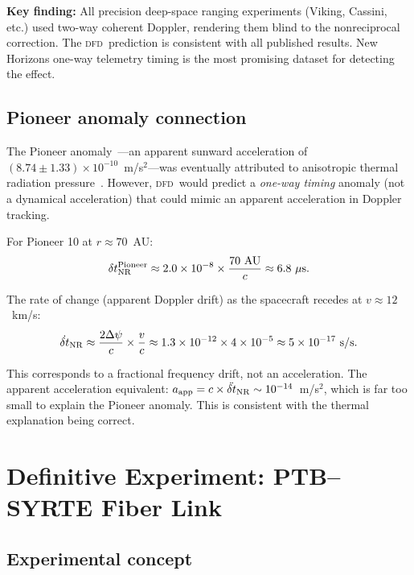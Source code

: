 \documentclass[aps,prl,twocolumn,superscriptaddress,showpacs]{revtex4-2}
\newcommand{\DFD}{\textsc{dfd}}
\begin{document}
\textbf{Key finding:} All precision deep-space ranging experiments
(Viking, Cassini, etc.) used two-way coherent Doppler, rendering
them blind to the nonreciprocal correction.  The \DFD\ prediction
is consistent with all published results.  New Horizons one-way
telemetry timing is the most promising dataset for detecting the
effect.

\subsection{Pioneer anomaly connection}

The Pioneer anomaly~\cite{Anderson2002}---an apparent sunward
acceleration of $(8.74\pm 1.33)\times 10^{-10}$~m/s$^2$---was
eventually attributed to anisotropic thermal radiation
pressure~\cite{Turyshev2012}.  However, \DFD\ would predict a
\emph{one-way timing} anomaly (not a dynamical acceleration)
that could mimic an apparent acceleration in Doppler tracking.

For Pioneer 10 at $r \approx 70$~AU:
\begin{equation}
\delta t_{\rm NR}^{\rm Pioneer} \approx 2.0\times 10^{-8}
\times\frac{70~\text{AU}}{c} \approx 6.8~\mu\text{s}.
\end{equation}

The rate of change (apparent Doppler drift) as the spacecraft
recedes at $v \approx 12$~km/s:
\begin{equation}
\dot{\delta t}_{\rm NR} \approx \frac{2\Delta\psi}{c}\times\frac{v}{c}
\approx 1.3\times 10^{-12}\times 4\times 10^{-5}
\approx 5\times 10^{-17}~\text{s/s}.
\end{equation}

This corresponds to a fractional frequency drift, not an
acceleration.  The apparent acceleration equivalent:
$a_{\rm app} = c\times\ddot{\delta t}_{\rm NR} \sim 10^{-14}$~m/s$^2$,
which is far too small to explain the Pioneer anomaly.  This is
consistent with the thermal explanation being correct.

\section{Definitive Experiment: PTB--SYRTE Fiber Link}
\label{sec:experiment}

\subsection{Experimental concept}
\end{document}

